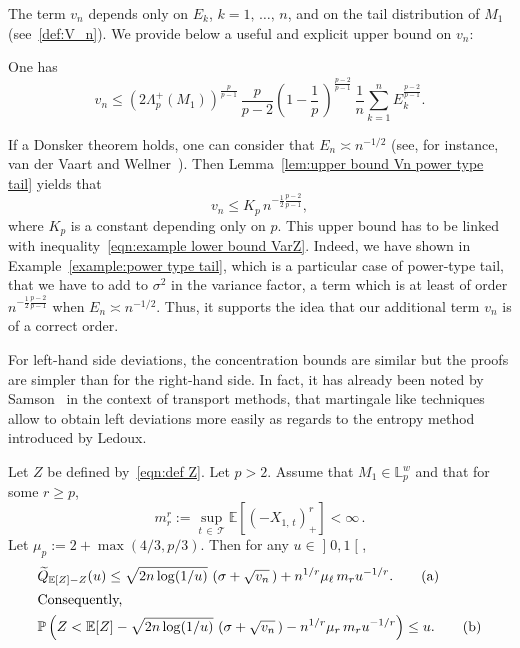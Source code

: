 \documentclass[AHL,Unicode,longabstracts,published]{cedram}
\newcommand{\bE}{\mathbb{E}}
\newcommand{\bL}{\mathbb{L}}
\newcommand{\bP}{\mathbb{P}}
\newcommand{\cT}{\mathcal{T}}
\newcommand{\intervalleoo}[2]{\mathopen{]} #1\mathclose{}\mathpunct{},#2\mathclose{[}}
\let\oldtilde\tilde
\renewcommand*{\tilde}[1]{\mathchoice{\widetilde{#1}}{\widetilde{#1}}{\oldtilde{#1}}{\oldtilde{#1}}}
\begin{document}
The term $v_n$ depends only on $E_k$, $k=1,\,\ldots,\,n$, and on the tail distribution of $M_1$ (see~\eqref{def:V_n}). We provide below a useful and explicit upper bound on $v_n$:
\begin{lemm}\label{lem:upper bound Vn power type tail}
One has
\[
v_n\leq \left(2\Lambda_p^+(M_1)\right)^{\frac{p}{p-1}}\,\frac{p}{p-2}\left(1-\frac 1p\,\right)^{\frac{p-2}{p-1}}\,\frac 1n \sum_{k=1}^n E_k^{\frac{p-2}{p-1}}.
\]
\end{lemm}

If a Donsker theorem holds, one can consider that $E_n\asymp n^{-1/2}$ (see, for instance, van der Vaart and Wellner~\cite{vdVW96}). Then Lemma~\ref{lem:upper bound Vn power type tail} yields that
\begin{equation}\label{eqn:upper bound equiv Vn power type tail}
v_n\leq K_p\,n^{-\frac 12\frac{p-2}{p-1}},
\end{equation}
where $K_p$ is a constant depending only on $p$. This upper bound has to be linked with inequality~\eqref{eqn:example lower bound VarZ}. Indeed, we have shown in Example~\ref{example:power type tail}, which is a particular case of power-type tail, that we have to add to $\sigma^2$ in the variance factor, a term which is at least of order $n^{-\frac 12\frac{p-2}{p-1}}$ when $E_n\asymp n^{-1/2}$. Thus, it supports the idea that our additional term $v_n$ is of a correct order.

For left-hand side deviations, the concentration bounds are similar but the proofs are simpler than for the right-hand side. In fact, it has already been noted by Samson~\cite{Samson07} in the context of transport methods, that martingale like techniques allow to obtain left deviations more easily as regards to the entropy method introduced by Ledoux.

\begin{theo}\label{thm:FukNagaev from Rio left}
Let $Z$ be defined by~\eqref{eqn:def Z}. Let $p>2$. Assume that $M_1\in\bL_p^w$ and that for some $r\geq p$,
\[
m_r^r:=\sup_{t\,\in\,\cT}\bE\left[(-X_{1,\,t})_+^r\right]<\infty\,.
\]
Let $\mu_p:=2+\max(4/3,p/3)$. Then for any $u\in\intervalleoo 01$,
\begin{align}
&\tilde Q_{\bE[Z]-Z}(u)\leq \sqrt{2n\log(1/u)}\,\left(\sigma+\sqrt{v_n}\,\right)+n^{1/r}\mu_\ell\,m_r u^{-1/r}. \tag{$\rm a$}\label{theo2.5.a}
\\
\intertext{Consequently,}
&\bP\left(Z<\bE[Z]-\sqrt{2n\log(1/u)}\,\left(\sigma+\sqrt{v_n}\,\right)-n^{1/r}\mu_r\,m_r u^{-1/r}\right)\leq u. \tag{$\rm b$}\label{theo2.5.b}
\end{align}
\end{theo}
\end{document}
